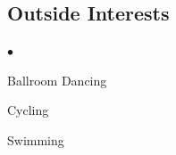\documentclass[margin,line]{res}
\newenvironment{list1}{
  \begin{list}{\ding{113}}{%
      \setlength{\itemsep}{0in}
      \setlength{\parsep}{0in} \setlength{\parskip}{0in}
      \setlength{\topsep}{0in} \setlength{\partopsep}{0in}
      \setlength{\leftmargin}{0.17in}}}{\end{list}}
\newenvironment{list2}{
  \begin{list}{$\bullet$}{%
      \setlength{\itemsep}{0in}
      \setlength{\parsep}{0in} \setlength{\parskip}{0in}
      \setlength{\topsep}{0in} \setlength{\partopsep}{0in}
      \setlength{\leftmargin}{0.2in}}}{\end{list}}
\begin{document}
\begin{resume}




\section{\sc Outside Interests}
 \begin{list2}
  \item Ballroom Dancing
  \item Cycling
  \item Swimming
 \end{list2}

\end{resume}
\end{document}
